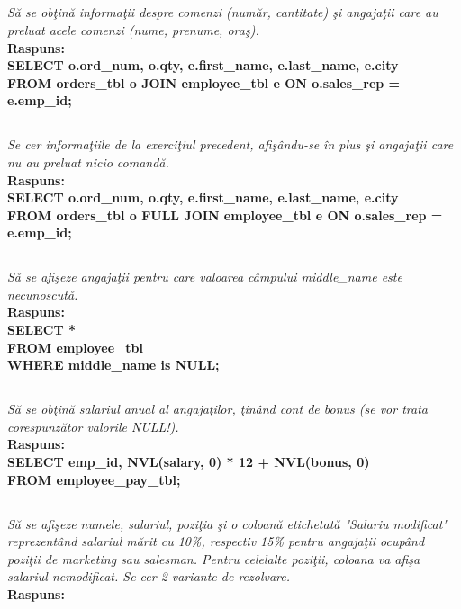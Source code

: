 \documentclass[a4paper,12pt]{article}
\begin{document}
	\subsection{}
	\textit{Să se obţină informaţii despre comenzi (număr, cantitate) şi angajaţii care au preluat acele comenzi (nume, prenume, oraş).\\}
	\textbf{Raspuns:\\SELECT o.ord\_num, o.qty, e.first\_name, e.last\_name, e.city\\
		FROM orders\_tbl o JOIN employee\_tbl e ON o.sales\_rep = e.emp\_id;}
	
	\subsection{}
	\textit{Se cer informaţiile de la exerciţiul precedent, afişându-se în plus şi angajaţii care nu au preluat nicio comandă.\\}
	\textbf{Raspuns:\\SELECT o.ord\_num, o.qty, e.first\_name, e.last\_name, e.city\\
		FROM orders\_tbl o FULL JOIN employee\_tbl e ON o.sales\_rep = e.emp\_id;}
	
	\subsection{}
	\textit{Să se afişeze angajaţii pentru care valoarea câmpului middle\_name este necunoscută.\\}
	\textbf{Raspuns:\\SELECT *\\
		FROM employee\_tbl\\
		WHERE middle\_name is NULL;}
	
	\subsection{}
	\textit{Să se obţină salariul anual al angajaţilor, ţinând cont de bonus (se vor trata corespunzător valorile NULL!).\\}
	\textbf{Raspuns:\\
	SELECT emp\_id, NVL(salary, 0) * 12 + NVL(bonus, 0)\\
	FROM employee\_pay\_tbl;}
	
	\subsection{}
	\textit{Să se afişeze numele, salariul, poziţia şi o coloană etichetată "Salariu modificat" reprezentând salariul mărit cu 10\%, respectiv 15\% pentru angajaţii ocupând poziţii de marketing sau salesman. Pentru celelalte poziţii, coloana va afişa salariul nemodificat. Se cer 2 variante de rezolvare.\\}
	\textbf{Raspuns:\\}
	
\end{document}
